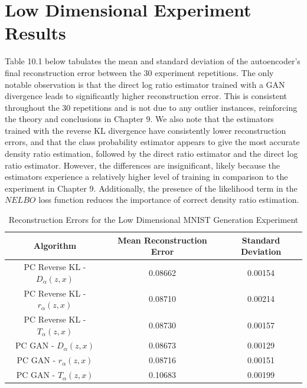 \documentclass[honours,12pt]{unswthesis}
\numberwithin{equation}{section}
\theoremstyle{definition}
\begin{document}
\section{Low Dimensional Experiment Results}
Table 10.1 below tabulates the mean and standard deviation of the autoencoder's final reconstruction error between the 30 experiment repetitions. The only notable observation is that the direct log ratio estimator trained with a GAN divergence leads to significantly higher reconstruction error. This is consistent throughout the 30 repetitions and is not due to any outlier instances, reinforcing the theory and conclusions in Chapter 9. We also note that the estimators trained with the reverse KL divergence have consistently lower reconstruction errors, and that the class probability estimator appears to give the most accurate density ratio estimation, followed by the direct ratio estimator and the direct log ratio estimator. However, the differences are insignificant, likely because the estimators experience a relatively higher level of training in comparison to the experiment in Chapter 9. Additionally, the presence of the likelihood term in the $NELBO$ loss function reduces the importance of correct density ratio estimation.
\begin{table}[h]
\centering
\begin{tabular}{|c|c|c|}
\hline
Algorithm & Mean Reconstruction Error & Standard Deviation\\
\hline
PC Reverse KL - $D_\alpha(z,x)$ & 0.08662 & 0.00154\\
\hline
PC Reverse KL - $r_\alpha(z,x)$ & 0.08710 & 0.00214\\
\hline
PC Reverse KL - $T_\alpha(z,x)$ & 0.08730 & 0.00157\\
\hline
PC GAN - $D_\alpha(z,x)$ & 0.08673 & 0.00129\\
\hline
PC GAN - $r_\alpha(z,x)$ & 0.08716 & 0.00151\\
\hline
PC GAN - $T_\alpha(z,x)$ & 0.10683 & 0.00199\\
\hline
\end{tabular}
\caption{Reconstruction Errors for the Low Dimensional MNIST Generation Experiment}
\end{table}
\newpage
\end{document}
